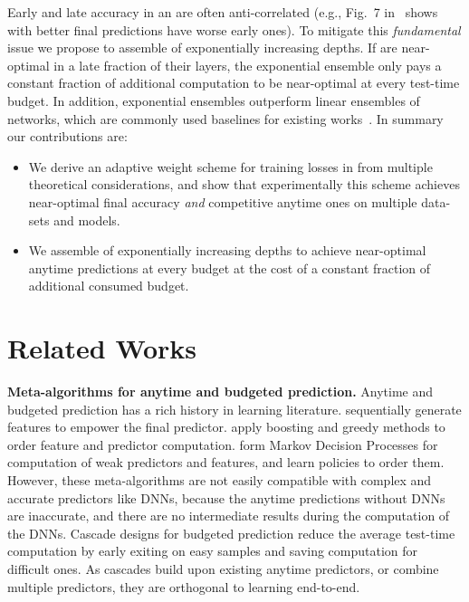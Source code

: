 Early and late accuracy in an \ann are often anti-correlated (e.g., Fig.~7 in~\cite{msdense} shows \anns with better final predictions have worse early ones). To mitigate this \emph{fundamental} issue we propose to assemble \anns of exponentially increasing depths. If \anns are near-optimal in a late fraction of their layers, the exponential ensemble only pays a constant fraction of additional computation to be near-optimal at every test-time budget. In addition, exponential ensembles outperform linear ensembles of networks, which are commonly used baselines for existing works~\cite{feedbacknet,msdense}. 
In summary our contributions are:
\begin{itemize}
    \item We derive an adaptive weight scheme for training losses in \anns from multiple theoretical considerations, and show that experimentally this scheme achieves near-optimal final accuracy \emph{and} competitive anytime ones on multiple data-sets and models.
    \item We assemble \anns of exponentially increasing depths to achieve near-optimal anytime predictions at every budget at the cost of a constant fraction of additional consumed budget. 
\end{itemize}



\section{Related Works}
\label{sec:ann_background}


\textbf{Meta-algorithms for anytime and budgeted prediction.}
Anytime and budgeted prediction has a rich history in learning literature.
\cite{weinberger09feature,xu:12,xu:13b} sequentially generate features to empower the final predictor.
\cite{reyzin:11,speedboost,hu:16} apply boosting and greedy methods to order feature and predictor computation.  
\cite{timeliness,rl_anytime} form Markov Decision Processes for computation of weak predictors and features, and learn policies to order them. However, these meta-algorithms are not easily compatible with complex and accurate predictors like DNNs, because the anytime predictions without DNNs are inaccurate, and there are no intermediate results during the computation of the DNNs.
Cascade designs for budgeted prediction \cite{cascade,lefakis:10,chen:12,xu:14,cai:15,adaptive_select,adaptivenn,cascade_nn} reduce the average test-time computation by early exiting on easy samples and saving computation for difficult ones. As cascades build upon existing anytime predictors, or combine multiple predictors, they are orthogonal to learning \anns end-to-end.

